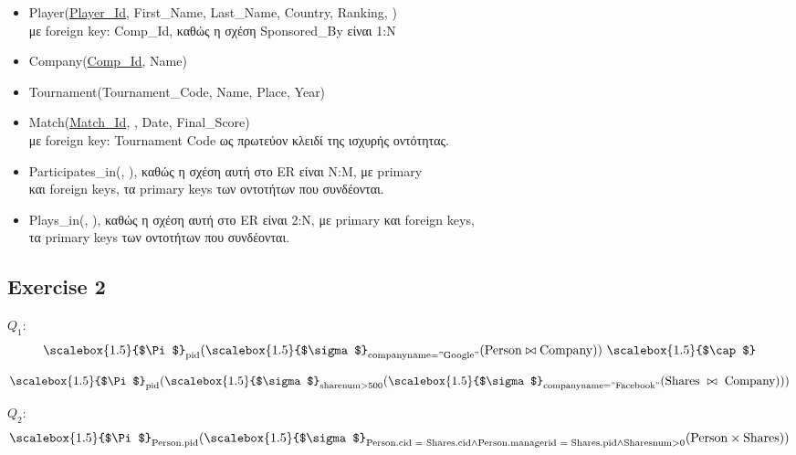 \documentclass[a4paper]{article}
\begin{document}
	\begin{itemize}
		\item Player(\uline{Player\_Id}, First\_Name, Last\_Name, Country, Ranking, ) \\
		
		με foreign key: Comp\_Id, καθώς η σχέση Sponsored\_By είναι 1:N
		\item Company(\uline{Comp\_Id}, Name) \\
		
		\item Tournament(Tournament\_Code, Name, Place, Year)  \\
		\item Match(\uline{Match\_Id}, , Date, Final\_Score) \\ 
		
		με foreign key: Tournament Code ως πρωτεύον κλειδί της ισχυρής οντότητας.
		\item Participates\_in(\uline{}, \uline{}), καθώς η σχέση αυτή στο ER είναι  Ν:Μ, με primary \\
		
		και foreign keys, τα  primary keys των οντοτήτων που συνδέονται.
		\item Plays\_in(\uline{}, \uline{}), καθώς η σχέση αυτή στο ER είναι 2:Ν, με primary και foreign keys, \\
		
		τα  primary keys των οντοτήτων που συνδέονται.
	\end{itemize}

\subsection*{Exercise 2}

$Q_1:$
\[
	\scalebox{1.5}{$\Pi$}_{\text{pid}}(\scalebox{1.5}{$\sigma$}_{\text{companyname=''Google''}}(\text{Person} \bowtie \text{Company})) \ \scalebox{1.5}{$\cap$} 
\]

\[
	\scalebox{1.5}{$\Pi$}_{\text{pid}}(\scalebox{1.5}{$\sigma$}_{\text{sharenum} >  \text{500}}(\scalebox{1.5}{$\sigma$}_{\text{companyname=''Facebook''}}(\text{Shares} \ \bowtie \ \text{Company})))
\]

$Q_2:$
\[
	\scalebox{1.5}{$\Pi$}_{\text{Person.pid}}(\scalebox{1.5}{$\sigma$}_{\text{Person.cid = Shares.cid} \land \text{Person.managerid = Shares.pid} \land \text{Sharesnum} > \text{0}}(\text{Person} \times \text{Shares}))
\]
\end{document}
